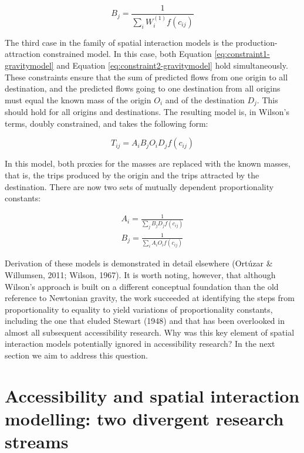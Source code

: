 \documentclass[
11pt, %
oneside, %
english, %
singlespacing, %
]{macthesis} %
\begin{document}
\begin{equation}
\label{eq:attraction-constrained-balancing-factor}
B_j = \frac{1}{\sum_i W_i^{(1)} f(c_{ij})}
\end{equation} 

The third case in the family of spatial interaction models is the production-attraction constrained model. In this case, both Equation \ref{eq:constraint1-gravitymodel} and Equation \ref{eq:constraint2-gravitymodel} hold simultaneously. These constraints ensure that the sum of predicted flows from one origin to all destination, and the predicted flows going to one destination from all origins must equal the known mass of the origin \(O_i\) and of the destination \(D_j\). This should hold for all origins and destinations. The resulting model is, in Wilson's terms, doubly constrained, and takes the following form:

\begin{equation}
\label{eq:doubly-constrained-gravitymodel}
T_{ij} = A_i B_j O_i D_j f(c_{ij})
\end{equation} 

In this model, both proxies for the masses are replaced with the known masses, that is, the trips produced by the origin and the trips attracted by the destination. There are now two sets of mutually dependent proportionality constants:

\begin{equation}
\label{eq:doubly-constrained-balancing-factors}
\begin{array}{l}
A_i = \frac{1}{\sum_j B_j D_j f(c_{ij})}\\
B_j = \frac{1}{\sum_i A_i O_i f(c_{ij})}
\end{array}
\end{equation} 

Derivation of these models is demonstrated in detail elsewhere (Ortúzar \& Willumsen, 2011; Wilson, 1967). It is worth noting, however, that although Wilson's approach is built on a different conceptual foundation than the old reference to Newtonian gravity, the work succeeded at identifying the steps from proportionality to equality to yield variations of proportionality constants, including the one that eluded Stewart (1948) and that has been overlooked in almost all subsequent accessibility research. Why was this key element of spatial interaction models potentially ignored in accessibility research? In the next section we aim to address this question.

\section{Accessibility and spatial interaction modelling: two divergent research streams}\label{accessibility-and-spatial-interaction-modelling-two-divergent-research-streams}
\end{document}

